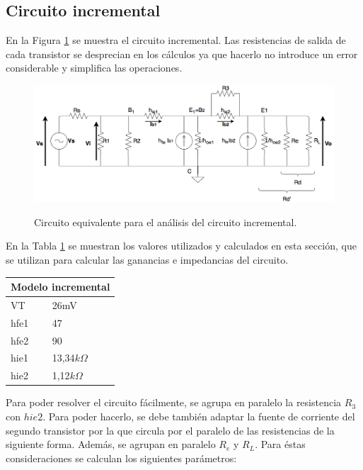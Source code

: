 	\subsection{Circuito incremental}
	
	En la Figura \ref{circ_incremental} se muestra el circuito incremental. Las resistencias de salida de cada transistor se desprecian en los cálculos ya que hacerlo no introduce un error considerable y simplifica las operaciones.
		\begin{figure}[H]
			\centering
			\includegraphics[scale=0.4]{./Imagenes/circ_incremental.png} \\
			\caption{Circuito equivalente para el an\'alisis del circuito incremental.}
			\label{circ_incremental}
		\end{figure}

En la Tabla \ref{tabla_valores_incremental} se muestran los valores utilizados y calculados en esta sección, que se utilizan para calcular las ganancias e impedancias del circuito.

\begin{table}[H]
\centering
\begin{tabular}{ll}
\multicolumn{2}{l}{Modelo incremental} \\ \hline
VT              & 26mV             \\
hfe1            & 47            \\
hfe2            & 90            \\
hie1            & 13,34$k\Omega$            \\
hie2            & 1,12$k\Omega$             \\
\end{tabular}
\label{tabla_valores_incremental} 
\end{table}

Para poder resolver el circuito fácilmente, se agrupa en paralelo la resistencia $R_3$ con $hie2$. Para poder hacerlo, se debe también adaptar la fuente de corriente del segundo transistor por la que circula por el paralelo de las resistencias de la siguiente forma. Además, se agrupan en paralelo $R_e$ y $R_L$. Para éstas consideraciones se calculan los siguientes parámetros:

